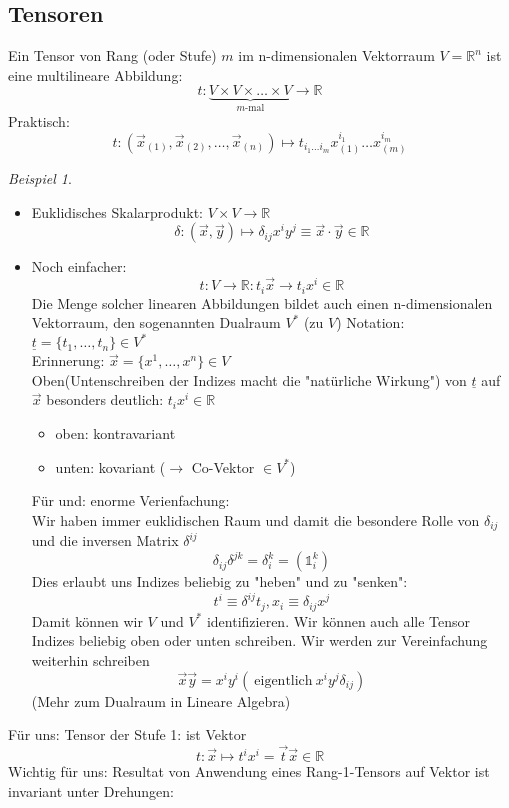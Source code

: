 \documentclass[a4paper]{scrartcl}
\renewcommand{\v}[1]{\vec{#1}}
\theoremstyle{definition}
\theoremstyle{plain}
\theoremstyle{remark}
\theoremstyle{remark}
\newtheorem{ex}{Beispiel}
\newcommand{\ubar}[1]{\underline{#1}}
\begin{document}
\subsection{Tensoren}
\label{sec-6-4}
Ein Tensor von Rang (oder Stufe) $m$ im n-dimensionalen Vektorraum $V = \mathbb{R}^n$ ist eine multilineare Abbildung:
\[t:\underbrace{V\times V\times \ldots \times V}_{m\text{-mal}} \to \mathbb{R}\]
Praktisch:
\[t: (\v x_{(1)}, \v x_{(2)}, \ldots, \v x_{(n)}) \mapsto t_{i_1 \ldots i_m} x_{(1)}^{i_1} \ldots x_{(m)}^{i_m} \]
\begin{ex}
\begin{itemize}
\item Euklidisches Skalarprodukt: $V\times V \to \mathbb{R}$
     \[\delta: (\v x, \v y) \mapsto \delta_{ij} x^i y^j \equiv \v x \cdot \v y \in \mathbb{R}\]
\item Noch einfacher:
\[t: V \to \mathbb{R}: t_i \v x \to t_i x^i \in \mathbb{R}\]
Die Menge solcher linearen Abbildungen bildet auch einen n-dimensionalen Vektorraum, den sogenannten Dualraum $V^\ast$ (zu $V$)
Notation: $\ubar t = \{t_1, \ldots, t_n\} \in V^\ast$ \\
     Erinnerung: $\v x = \{x^1, \ldots, x^n\} \in V$ \\
     Oben(Untenschreiben der Indizes macht die "natürliche Wirkung") von $\ubar t$ auf $\v x$ besonders deutlich: $t_i x^i \in \mathbb{R}$
\begin{itemize}
\item oben: kontravariant
\item unten: kovariant ($\rightarrow$ Co-Vektor $\in V^\ast$)
\end{itemize}
Für und: enorme Verienfachung: \\
     Wir haben immer euklidischen Raum und damit die besondere Rolle von $\delta_{ij}$ und die inversen Matrix $\delta^{ij}$
\[\delta_{ij} \delta^{jk} = \delta_i^k = (\mathbb{1}_i^k)\]
Dies erlaubt uns Indizes beliebig zu "heben" und zu "senken":
\[t^i \equiv \delta^{ij} t_j, x_i \equiv \delta_{ij}x^j\]
Damit können wir $V$ und $V^\ast$ identifizieren. Wir können auch alle Tensor Indizes beliebig oben oder unten schreiben.
Wir werden zur Vereinfachung weiterhin schreiben
\[\v x \v y = x^i y^i (~\text{eigentlich}~x^i y^j \delta_{ij})\]
(Mehr zum Dualraum in Lineare Algebra)
\end{itemize}
\end{ex}
Für uns: Tensor der Stufe 1: ist Vektor
\[t: \v x \mapsto t^i x^i = \v t \v x \in \mathbb{R}\]
Wichtig für uns: Resultat von Anwendung eines Rang-1-Tensors auf Vektor ist invariant unter Drehungen:
\end{document}
